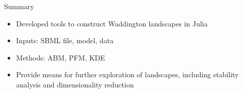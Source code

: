 \documentclass{beamer}
\begin{document}
\begin{frame}{Summary}
\begin{itemize}
\item Developed tools to construct Waddington landscapes in Julia
\item Inputs: SBML file, model, data
\item Methods: ABM, PFM, KDE
\item Provide means for further exploration of landscapes, including stability analysis and dimensionality reduction
\end{itemize}
\end{frame}
\end{document}
